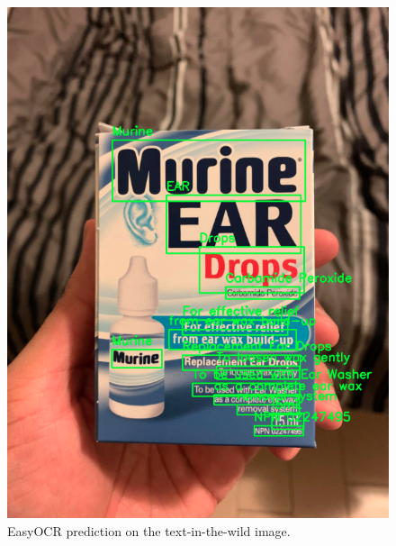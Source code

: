 \documentclass[a4paper,11pt]{article}
\begin{document}
\begin{figure}[H]
\centering
\includegraphics[scale=0.4]{img/ocr_testing/eardrop_easyocr.png}
\caption{EasyOCR prediction on the text-in-the-wild image.}
\label{fig:eardrop_easyocr}
\end{figure}
\end{document}

